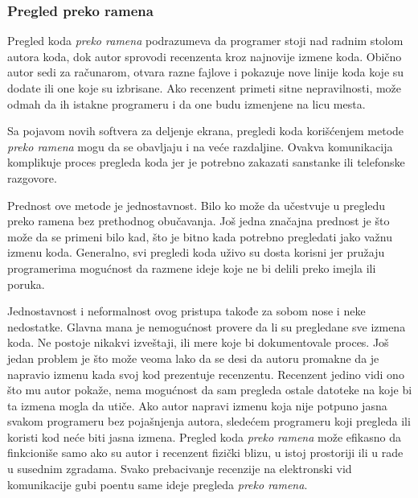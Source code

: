 \documentclass[a4paper]{article}
\begin{document}
		\subsubsection{Pregled preko ramena}
		Pregled koda \textit{preko ramena} podrazumeva da programer stoji nad radnim stolom autora koda, dok autor sprovodi recenzenta kroz najnovije izmene koda. Obično autor sedi za računarom, otvara razne fajlove i pokazuje nove linije koda koje su dodate ili one koje su izbrisane. Ako recenzent primeti sitne nepravilnosti, može odmah da ih istakne programeru i da one budu izmenjene na licu mesta.
		
		
		Sa pojavom novih softvera za deljenje ekrana, pregledi koda korišćenjem metode \textit{preko ramena} mogu da se obavljaju i na veće razdaljine. Ovakva komunikacija komplikuje proces pregleda koda jer je potrebno zakazati sanstanke ili telefonske razgovore.
		
		Prednost ove metode je jednostavnost. Bilo ko može da učestvuje u pregledu preko ramena bez prethodnog obučavanja. Još jedna značajna prednost je što može da se primeni bilo kad, što je bitno kada potrebno pregledati jako važnu izmenu koda. Generalno, svi pregledi koda uživo su dosta korisni jer pružaju programerima mogućnost da razmene ideje koje ne bi delili preko imejla ili poruka.
		
		Jednostavnost i neformalnost ovog pristupa takođe za sobom nose i neke nedostatke. Glavna mana je nemogućnost provere da li su pregledane sve izmena koda. Ne postoje nikakvi izveštaji, ili mere koje bi dokumentovale proces. Još jedan problem je što može veoma lako da se desi da autoru promakne da je napravio izmenu kada svoj kod prezentuje recenzentu. Recenzent jedino vidi ono što mu autor pokaže, nema mogućnost da sam pregleda ostale datoteke na koje bi ta izmena mogla da utiče. Ako autor napravi izmenu koja nije potpuno jasna svakom programeru bez pojašnjenja autora, sledećem programeru koji pregleda ili koristi kod neće biti jasna izmena. Pregled koda \textit{preko ramena} može efikasno da finkcioniše samo ako su autor i recenzent  fizički blizu, u istoj prostoriji ili u rade u susednim zgradama. Svako prebacivanje recenzije na elektronski vid komunikacije gubi poentu same ideje pregleda \textit{preko ramena}.
		
\\		
\end{document}
